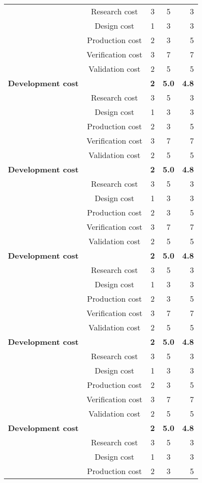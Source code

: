 \begin{center}
\begin{scriptsize}
\begin{longtable}[c]{lcccr}
  & Research cost & 3 & 5 & 3 \\
  & Design cost & 1 & 3 & 3 \\
  & Production cost & 2 & 3 & 5 \\
  & Verification cost & 3 & 7 & 7 \\
  & Validation cost & 2 & 5 & 5 \\ \hline
   \textbf{Development cost} & & \textbf{2} & \textbf{5.0} & \textbf{4.8} \\
  & Research cost & 3 & 5 & 3 \\
  & Design cost & 1 & 3 & 3 \\
  & Production cost & 2 & 3 & 5 \\
  & Verification cost & 3 & 7 & 7 \\
  & Validation cost & 2 & 5 & 5 \\ \hline
   \textbf{Development cost} & & \textbf{2} & \textbf{5.0} & \textbf{4.8} \\
  & Research cost & 3 & 5 & 3 \\
  & Design cost & 1 & 3 & 3 \\
  & Production cost & 2 & 3 & 5 \\
  & Verification cost & 3 & 7 & 7 \\
  & Validation cost & 2 & 5 & 5 \\
  \textbf{Development cost} & & \textbf{2} & \textbf{5.0} & \textbf{4.8} \\
  & Research cost & 3 & 5 & 3 \\
  & Design cost & 1 & 3 & 3 \\
  & Production cost & 2 & 3 & 5 \\
  & Verification cost & 3 & 7 & 7 \\
  & Validation cost & 2 & 5 & 5 \\
  \textbf{Development cost} & & \textbf{2} & \textbf{5.0} & \textbf{4.8} \\
  & Research cost & 3 & 5 & 3 \\
  & Design cost & 1 & 3 & 3 \\
  & Production cost & 2 & 3 & 5 \\
  & Verification cost & 3 & 7 & 7 \\
  & Validation cost & 2 & 5 & 5 \\
  \textbf{Development cost} & & \textbf{2} & \textbf{5.0} & \textbf{4.8} \\
  & Research cost & 3 & 5 & 3 \\
  & Design cost & 1 & 3 & 3 \\
  & Production cost & 2 & 3 & 5 \\

\end{longtable}
\end{scriptsize}
\end{center}

